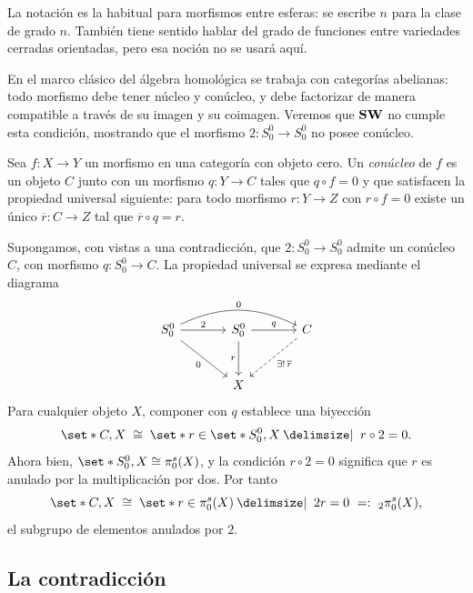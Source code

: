 \begin{nota}
   La notación es la habitual para morfismos entre esferas: se escribe $n$ para la clase de grado $n$. También tiene sentido hablar del grado de funciones entre variedades cerradas orientadas, pero esa noción no se usará aquí.
\end{nota}

En el marco clásico del álgebra homológica se trabaja con categorías abelianas: todo morfismo debe tener núcleo y conúcleo, y debe factorizar de manera compatible a través de su imagen y su coimagen. Veremos que $\mathbf{SW}$ no cumple esta condición, mostrando que el morfismo $2\colon S^0_0\to S^0_0$ no posee conúcleo.

\begin{defi}
Sea $f\colon X\to Y$ un morfismo en una categoría con objeto cero. Un \emph{conúcleo} de $f$ es un objeto $C$ junto con un morfismo $q\colon Y\to C$ tales que $q\circ f=0$ y que satisfacen la propiedad universal siguiente: para todo morfismo $r\colon Y\to Z$ con $r\circ f=0$ existe un único $\overline r\colon C\to Z$ tal que $\overline r\circ q=r$.
\end{defi}

Supongamos, con vistas a una contradicción, que $2\colon S^0_0\to S^0_0$ admite un conúcleo $C$, con morfismo $q\colon S^0_0\to C$. La propiedad universal se expresa mediante el diagrama
\[
\begin{tikzcd}[column sep=large,row sep=large]
S^0_0 \arrow[r,"2"] \arrow[rr,bend left=25,"0"] \arrow[dr,"0"'] & S^0_0 \arrow[r,"q"] \arrow[d,"r"'] & C \arrow[dl,dashed,"\exists!\,\overline r"]\\
& X &
\end{tikzcd}
\]
Para cualquier objeto $X$, componer con $q$ establece una biyección
\[
\set*{C,X}\;\cong\;\set*{r\in\set*{S^0_0,X}\given\ r\circ 2=0}.
\]
Ahora bien, $\set*{S^0_0,X}\cong\pi_0^s(X)$, y la condición $r\circ 2=0$ significa que $r$ es anulado por la multiplicación por dos. Por tanto
\[
\set*{C,X}\;\cong\;\set*{r\in\pi_0^s(X)\given\ 2r=0}
\ =:\ {}_2\pi_0^s(X),
\]
el subgrupo de elementos anulados por $2$. 

\subsection{La contradicción}

